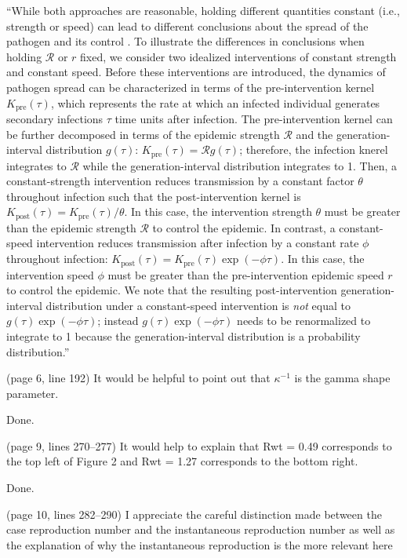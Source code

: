 \documentclass[12pt]{article}
\newcommand{\RR}{\ensuremath{{\mathcal R}}\xspace}
\newcommand{\revtext}{\textsf}
\begin{document}
``While both approaches are reasonable, holding different quantities constant (i.e., strength or speed) can lead to different conclusions about the spread of the pathogen and its control \citep{doi:10.1098/rspb.2020.1556}.
To illustrate the differences in conclusions when holding $\RR$ or $r$ fixed, we consider two idealized interventions of constant strength and constant speed.
Before these interventions are introduced, the dynamics of pathogen spread can be characterized in terms of the pre-intervention kernel $K_{\mathrm{pre}}(\tau)$, which represents the rate at which an infected individual generates secondary infections $\tau$ time units after infection.
The pre-intervention kernel can be further decomposed in terms of the epidemic strength $\RR$ and the generation-interval distribution $g(\tau)$: $K_{\mathrm{pre}}(\tau) = \RR g(\tau)$;
therefore, the infection knerel integrates to $\RR$ while the generation-interval distribution integrates to 1.
Then, a constant-strength intervention reduces transmission by a constant factor $\theta$ throughout infection such that the post-intervention kernel is $K_{\mathrm{post}}(\tau) = K_{\mathrm{pre}}(\tau)/\theta$.
In this case, the intervention strength $\theta$ must be greater than the epidemic strength $\RR$ to control the epidemic.
In contrast, a constant-speed intervention reduces transmission after infection by a constant rate $\phi$ throughout infection: $K_{\mathrm{post}}(\tau) = K_{\mathrm{pre}}(\tau) \exp(-\phi \tau)$.
In this case, the intervention speed $\phi$ must be greater than the pre-intervention epidemic speed $r$ to control the epidemic.
We note that the resulting post-intervention generation-interval distribution under a constant-speed intervention is \emph{not} equal to $g(\tau) \exp(-\phi \tau)$; instead $g(\tau) \exp(-\phi \tau)$ needs to be renormalized to integrate to 1 because the generation-interval distribution is a probability distribution.''

\revtext{(page 6, line 192) It would be helpful to point out that $\kappa^{-1}$ is the gamma shape parameter.}

Done.

\revtext{(page 9, lines 270–277) It would help to explain that Rwt = 0.49 corresponds to the top left of Figure 2 and Rwt = 1.27 corresponds to the bottom right.}

Done.

\revtext{(page 10, lines 282–290) I appreciate the careful distinction made between
the case reproduction number and the instantaneous reproduction number
as well as the explanation of why the instantaneous reproduction is the
more relevant here}
\end{document}
